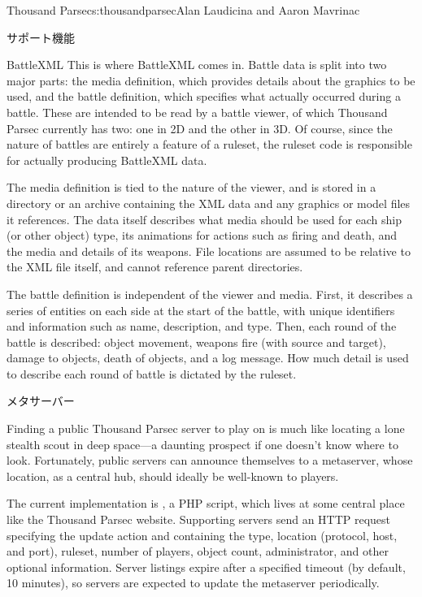 \begin{aosachapter}{Thousand Parsec}{s:thousandparsec}{Alan Laudicina and Aaron Mavrinac}
\begin{aosasect1}{サポート機能}
\begin{aosasect2}{BattleXML}
This is where BattleXML comes in. Battle data is split into two major
parts: the media definition, which provides details about the graphics
to be used, and the battle definition, which specifies what actually
occurred during a battle. These are intended to be read by a battle
viewer, of which Thousand Parsec currently has two: one in 2D and the
other in 3D\@. Of course, since the nature of battles are entirely a
feature of a ruleset, the ruleset code is responsible for actually
producing BattleXML data.

The media definition is tied to the nature of the viewer, and is
stored in a directory or an archive containing the XML data and any
graphics or model files it references. The data itself describes what
media should be used for each ship (or other object) type, its
animations for actions such as firing and death, and the media and
details of its weapons. File locations are assumed to be relative to
the XML file itself, and cannot reference parent directories.

The battle definition is independent of the viewer and media. First,
it describes a series of entities on each side at the start of the
battle, with unique identifiers and information such as name,
description, and type. Then, each round of the battle is described:
object movement, weapons fire (with source and target), damage to
objects, death of objects, and a log message. How much detail is used
to describe each round of battle is dictated by the ruleset.

\end{aosasect2}

\begin{aosasect2}{メタサーバー}

Finding a public Thousand Parsec server to play on 
is much like locating a lone stealth scout in deep space---a
daunting prospect if one doesn't know where to look. Fortunately,
public servers can announce themselves to a metaserver, whose
location, as a central hub, should ideally be well-known to players.

The current implementation is , a PHP script,
which lives at some central place like the Thousand Parsec
website. Supporting servers send an HTTP request specifying the update
action and containing the type, location (protocol, host, and port),
ruleset, number of players, object count, administrator, and other
optional information. Server listings expire after a specified timeout
(by default, 10 minutes), so servers are expected to update the
metaserver periodically.


\end{aosasect2}
\end{aosasect1}
\end{aosachapter}
